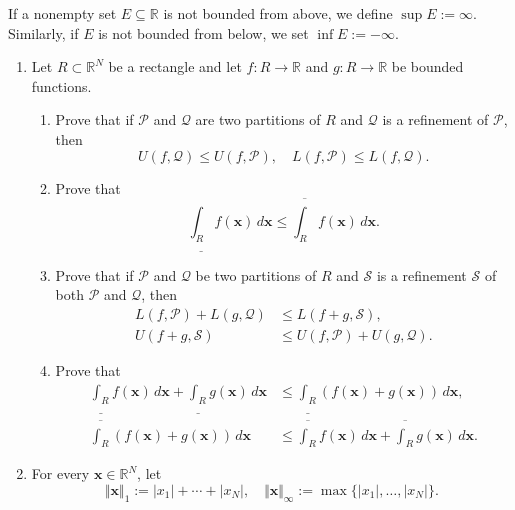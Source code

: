 \documentclass{article}%
\begin{document}
If a nonempty set $E\subseteq\mathbb{R}$ is not bounded from above, we define
$\sup E:=\infty$. Similarly, if $E$ is not bounded from below, we set $\inf
E:=-\infty$.

\begin{enumerate}
\item Let $R\subset\mathbb{R}^{N}$ be a rectangle and let $f:R\rightarrow
\mathbb{R}$ and $g:R\rightarrow\mathbb{R}$  be bounded functions.

\begin{enumerate}
\item Prove that if $\mathcal{P}$ and $\mathcal{Q}$ are two partitions of $R$
and $\mathcal{Q}$ is a refinement of $\mathcal{P}$, then
\[
U(f,\mathcal{Q})\leq U(f,\mathcal{P}),\quad L(f,\mathcal{P})\leq
L(f,\mathcal{Q}).
\]


\item Prove that%
\[
\underline{\int_{R}}f\left(  \boldsymbol{x}\right)  \,d\boldsymbol{x}%
\leq\overline{\int_{R}}f\left(  \boldsymbol{x}\right)  \,d\boldsymbol{x}.
\]


\item Prove that if $\mathcal{P}$ and $\mathcal{Q}$ be two partitions of $R$
and $\mathcal{S}$ is a refinement $\mathcal{S}$ of both $\mathcal{P}$ and
$\mathcal{Q}$, then
\begin{align*}
L\left(  f,\mathcal{P}\right)  +L(g,\mathcal{Q})  & \leq L\left(
f+g,\mathcal{S}\right)  ,\\
U\left(  f+g,\mathcal{S}\right)    & \leq U\left(  f,\mathcal{P}\right)
+U(g,\mathcal{Q}).
\end{align*}


\item Prove that%
\begin{align*}
\underline{\int_{R}}f\left(  \boldsymbol{x}\right)  \,d\boldsymbol{x}%
+\underline{\int_{R}}g\left(  \boldsymbol{x}\right)  \,d\boldsymbol{x}  &
\leq\underline{\int_{R}}\left(  f\left(  \boldsymbol{x}\right)  +g\left(
\boldsymbol{x}\right)  \right)  \,d\boldsymbol{x},\\
\overline{\int_{R}}\left(  f\left(  \boldsymbol{x}\right)  +g\left(
\boldsymbol{x}\right)  \right)  \,d\boldsymbol{x}  & \leq\overline{\int_{R}%
}f\left(  \boldsymbol{x}\right)  \,d\boldsymbol{x}+\overline{\int_{R}}g\left(
\boldsymbol{x}\right)  \,d\boldsymbol{x}.
\end{align*}

\end{enumerate}

\item For every $\boldsymbol{x}\in\mathbb{R}^{N}$, let%
\[
\Vert\boldsymbol{x}\Vert_{1}:=|x_{1}|+\cdots+|x_{N}|,\quad\Vert\boldsymbol{x}%
\Vert_{\infty}:=\max\{|x_{1}|,\ldots,|x_{N}|\}.
\]



\end{enumerate}
\end{document}
